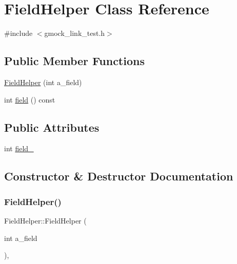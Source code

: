 \hypertarget{classFieldHelper}{}\section{Field\+Helper Class Reference}
\label{classFieldHelper}


{\ttfamily \#include $<$gmock\+\_\+link\+\_\+test.\+h$>$}

\subsection*{Public Member Functions}
\begin{DoxyCompactItemize}
\item 
\mbox{\hyperlink{classFieldHelper_a06729cbd5da2993e8007cb62f1d00b3a}{Field\+Helper}} (int a\+\_\+field)
\item 
int \mbox{\hyperlink{classFieldHelper_af2959e142813205aeeb4d2ad27430ad3}{field}} () const
\end{DoxyCompactItemize}
\subsection*{Public Attributes}
\begin{DoxyCompactItemize}
\item 
int \mbox{\hyperlink{classFieldHelper_a50a7ec9efc60377363d5ce8bea1708ac}{field\+\_\+}}
\end{DoxyCompactItemize}


\subsection{Constructor \& Destructor Documentation}
\mbox{\label{classFieldHelper_a06729cbd5da2993e8007cb62f1d00b3a}} 
\subsubsection{\texorpdfstring{FieldHelper()}{FieldHelper()}}
{\footnotesize\ttfamily Field\+Helper\+::\+Field\+Helper (\begin{DoxyParamCaption}\item[{int}]{a\+\_\+field }\end{DoxyParamCaption})\hspace{0.3cm}{\ttfamily [inline]}, {\ttfamily [explicit]}}



